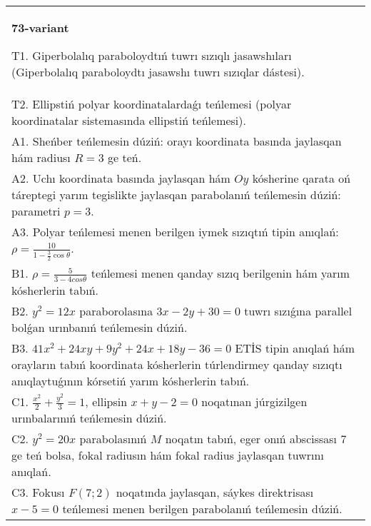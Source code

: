 \documentclass{article}
\begin{document}
\begin{tabular}{m{17cm}}
\textbf{73-variant}
\newline

T1. Giperbolalıq paraboloydtıń tuwrı sızıqlı jasawshıları (Giperbolalıq paraboloydtı jasawshı tuwrı sızıqlar dástesi).\\

T2. Ellipstiń polyar koordinatalardaǵı teńlemesi (polyar koordinatalar sistemasında ellipstiń teńlemesi).\\

A1. Sheńber teńlemesin dúziń: orayı koordinata basında jaylasqan hám radiusı $R=3$ ge teń.\\

A2. Uchı koordinata basında jaylasqan hám $Oy$ kósherine qarata oń táreptegi yarım tegislikte jaylasqan parabolanıń teńlemesin dúziń: parametri $p=3$.\\

A3. Polyar teńlemesi menen berilgen iymek sızıqtıń tipin anıqlań: $\rho=\frac{10}{1-\frac{3}{2}\cos\theta}$.\\

B1. $\rho = \frac{5}{3 - 4cos\theta}$ teńlemesi menen qanday sızıq berilgenin hám yarım kósherlerin tabıń.  \\

B2. $y^{2} = 12x$ paraborolasına $3x - 2y + 30 = 0$ tuwrı sızıǵına parallel bolǵan urınbanıń teńlemesin dúziń.  \\

B3. $41x^{2} + 24xy + 9y^{2} + 24x + 18y - 36 = 0$ ETİS tipin anıqlań hám orayların tabıń koordinata kósherlerin túrlendirmey qanday sızıqtı anıqlaytuǵının kórsetiń yarım kósherlerin tabıń.  \\

C1. $\frac{x^{2}}{2} + \frac{y^{2}}{3} = 1$, ellipsin $x + y - 2 = 0$ noqatınan júrgizilgen urınbalarınıń teńlemesin dúziń.  \\

C2. $y^{2} = 20x$ parabolasınıń $M$ noqatın tabıń, eger onıń abscissası 7 ge teń bolsa, fokal radiusın hám fokal radius jaylasqan tuwrını anıqlań.\\

C3. Fokusı $F(7;2)$ noqatında jaylasqan, sáykes direktrisası $x - 5 = 0$ teńlemesi menen berilgen parabolanıń teńlemesin dúziń.  \\

\end{tabular}
\vspace{1cm}
\end{document}
